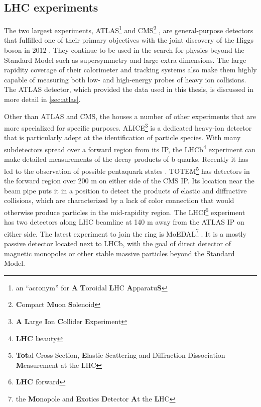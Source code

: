 \subsection{LHC experiments}
The two largest \lhc experiments, ATLAS\footnote{an ``acronym'' for \textbf{A} \textbf{T}oroidal \textbf{L}HC \textbf{A}pparatu\textbf{S}} \cite{Aad:2008zzm} and CMS\footnote{\textbf{C}ompact \textbf{M}uon \textbf{S}olenoid} \cite{Chatrchyan:2008aa}, are general-purpose detectors that fulfilled one of their primary objectives with the joint discovery of the Higgs boson in 2012 \cite{HIGG-2012-27,Chatrchyan:2012xdj}.
They continue to be used in the search for physics beyond the Standard Model such as supersymmetry and large extra dimensions.
The large rapidity coverage of their calorimeter and tracking systems also make them highly capable of measuring both low- and high-energy probes of heavy ion collisions.
The ATLAS detector, which provided the data used in this thesis, is discussed in more detail in \cref{sec:atlas}.

Other than ATLAS and CMS, the \lhc houses a number of other experiments that are more specialized for specific purposes.
ALICE\footnote{\textbf{A} \textbf{L}arge \textbf{I}on \textbf{C}ollider \textbf{E}xperiment} \cite{Aamodt:2008zz} is a dedicated heavy-ion detector that is particularly adept at the identification of particle species.
With many subdetectors spread over a forward region from its \ac{IP}, the LHCb\footnote{\textbf{LHC b}eauty} experiment \cite{Alves:2008zz} can make detailed measurements of the decay products of b-quarks. Recently it has led to the observation of possible pentaquark states \cite{Aaij:2015tga}.
TOTEM\footnote{\textbf{Tot}al Cross Section, \textbf{E}lastic Scattering and Diffraction Dissociation \textbf{M}easurement at the LHC} \cite{Anelli:2008zza} has detectors in the forward region over 200 m on either side of the CMS \ac{IP}.
Its location near the beam pipe puts it in a position to detect the products of elastic and diffractive collisions, which are characterized by a lack of color connection that would otherwise produce particles in the mid-rapidity region.
The LHCf\footnote{\textbf{LHC f}orward} experiment \cite{Adriani:2008zz} has two detectors along LHC beamline at 140 m away from the ATLAS \ac{IP} on either side.
The latest experiment to join the ring is MoEDAL\footnote{the \textbf{Mo}nopole and \textbf{E}xotics \textbf{D}etector \textbf{A}t the \textbf{L}HC} \cite{Acharya:2014nyr}.
It is a mostly passive detector located next to LHCb, with the goal of direct detector of magnetic monopoles or other stable massive particles beyond the Standard Model.

